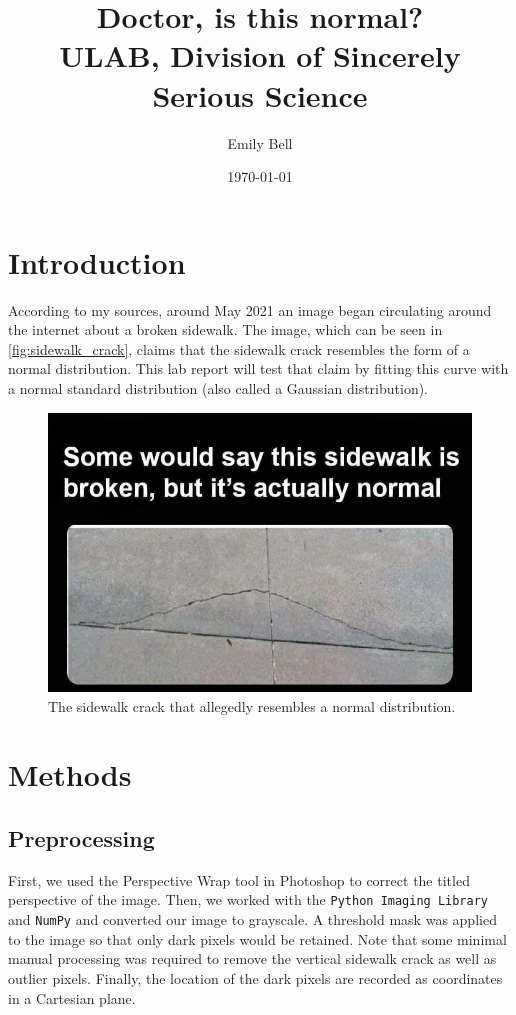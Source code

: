 \documentclass{article}
\title{Doctor, is this normal?\\ \large ULAB, Division of Sincerely Serious Science}
\author{Emily Bell}
\date{\today}
\begin{document}
\maketitle

\section{Introduction}

According to my sources, around May 2021 an image began circulating around the internet about a broken sidewalk. The image, which can be seen in  \autoref{fig:sidewalk_crack}, claims that the sidewalk crack resembles the form of a normal distribution. This lab report will test that claim by fitting this curve with a normal standard distribution (also called a Gaussian distribution).

\begin{figure}[h]
    \centering
    \includegraphics[width=0.8\linewidth]{img.jpg}
    \caption{The sidewalk crack that allegedly resembles a normal distribution.}
    \label{fig:sidewalk_crack}
\end{figure}

\section{Methods}

\subsection{Preprocessing}

First, we used the Perspective Wrap tool in Photoshop to correct the titled perspective of the image. Then, we worked with the \texttt{Python Imaging Library} and \texttt{NumPy} \cite{2020SciPy-NMeth} and converted our image to grayscale. A threshold mask was applied to the image so that only dark pixels would be retained. Note that some minimal manual processing was required to remove the vertical sidewalk crack as well as outlier pixels.
Finally, the location of the dark pixels are recorded as coordinates in a Cartesian plane.
\end{document}
